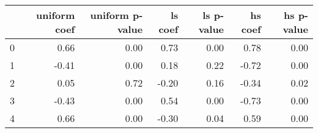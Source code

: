 \begin{tabular}{lrrrrrr}
\toprule
 & uniform coef & uniform p-value & ls coef & ls p-value & hs coef & hs p-value \\
\midrule
0 & 0.66 & 0.00 & 0.73 & 0.00 & 0.78 & 0.00 \\
1 & -0.41 & 0.00 & 0.18 & 0.22 & -0.72 & 0.00 \\
2 & 0.05 & 0.72 & -0.20 & 0.16 & -0.34 & 0.02 \\
3 & -0.43 & 0.00 & 0.54 & 0.00 & -0.73 & 0.00 \\
4 & 0.66 & 0.00 & -0.30 & 0.04 & 0.59 & 0.00 \\
\bottomrule
\end{tabular}

